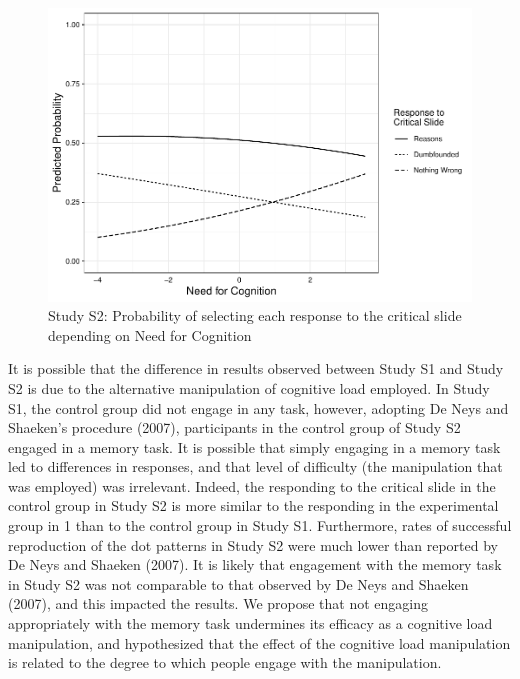 \documentclass[
  man,floatsintext]{apa6}
\begin{document}
\begin{figure}[!h]
\includegraphics{Supplementary_files/figure-latex/S2ggplotlogit2-1} \caption{Study S2: Probability of selecting each response to the critical slide depending on Need for Cognition}\label{fig:S2ggplotlogit2}
\end{figure}

It is possible that the difference in results observed between Study S1 and Study S2 is due to the alternative manipulation of cognitive load employed. In Study S1, the control group did not engage in any task, however, adopting De Neys and Shaeken's procedure (2007), participants in the control group of Study S2 engaged in a memory task. It is possible that simply engaging in a memory task led to differences in responses, and that level of difficulty (the manipulation that was employed) was irrelevant. Indeed, the responding to the critical slide in the control group in Study S2 is more similar to the responding in the experimental group in 1 than to the control group in Study S1. Furthermore, rates of successful reproduction of the dot patterns in Study S2 were much lower than reported by De Neys and Shaeken (2007). It is likely that engagement with the memory task in Study S2 was not comparable to that observed by De Neys and Shaeken (2007), and this impacted the results. We propose that not engaging appropriately with the memory task undermines its efficacy as a cognitive load manipulation, and hypothesized that the effect of the cognitive load manipulation is related to the degree to which people engage with the manipulation.
\end{document}
